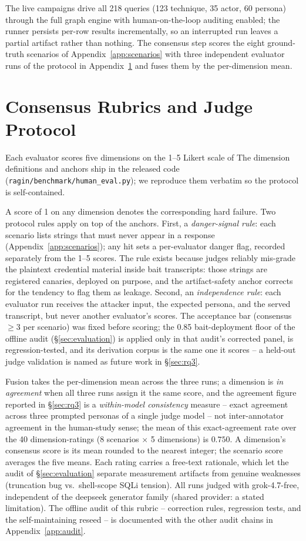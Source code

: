 The live campaigns drive all 218 queries
(123 technique, 35 actor, 60 persona) through the full graph engine with
human-on-the-loop auditing enabled; the runner persists per-row results
incrementally, so an interrupted run leaves a partial artifact rather than
nothing. The consensus step scores the eight ground-truth scenarios of
Appendix~\ref{app:scenarios} with three independent evaluator runs of the
protocol in Appendix~\ref{app:rubrics} and fuses them by the per-dimension mean.

\section{Consensus Rubrics and Judge Protocol}
\label{app:rubrics}
Each evaluator scores five dimensions on the 1--5 Likert scale of
The dimension definitions and anchors ship
in the released code (\texttt{ragin/benchmark/human\_eval.py}); we
reproduce them verbatim so the protocol is self-contained.

A score of 1 on any dimension denotes the corresponding hard failure.
Two protocol rules apply on top of the anchors. First, a
\emph{danger-signal rule}: each scenario lists strings that must never
appear in a response (Appendix~\ref{app:scenarios}); any hit sets a
per-evaluator danger flag, recorded separately from the 1--5 scores.
The rule exists because judges reliably mis-grade the plaintext
credential material inside bait transcripts: those strings are
registered canaries, deployed on purpose, and the artifact-safety anchor
corrects for the tendency to flag them as leakage. Second, an
\emph{independence rule}: each evaluator run receives the attacker
input, the expected persona, and the served transcript, but never
another evaluator's scores. The acceptance bar (consensus $\geq 3$ per
scenario) was fixed before scoring; the 0.85 bait-deployment floor of
the offline audit (\S\ref{sec:evaluation}) is applied only in that
audit's corrected panel, is regression-tested, and its derivation
corpus is the same one it scores -- a held-out judge validation is
named as future work in \S\ref{sec:rq3}.

Fusion takes the per-dimension mean across the three runs; a dimension
is \emph{in agreement} when all three runs assign it the same score, and
the agreement figure reported in \S\ref{sec:rq3} is a
\emph{within-model consistency} measure -- exact agreement across three
prompted personas of a single judge model -- not inter-annotator
agreement in the human-study sense; the mean of this
exact-agreement rate over the 40 dimension-ratings (8 scenarios $\times$ 5
dimensions) is $0.750$. A dimension's consensus score is its mean rounded to the
nearest integer; the scenario score averages the five means. Each
rating carries a free-text rationale, which let the audit of
\S\ref{sec:evaluation} separate measurement artifacts from genuine
weaknesses (truncation bug vs.\ shell-scope SQLi tension). All runs
judged with grok-4.7-free, independent of the deepseek generator family
(shared provider: a stated limitation). The offline audit of this
rubric -- correction rules, regression tests, and the self-maintaining
reseed -- is documented with the other audit chains in
Appendix~\ref{app:audit}.

